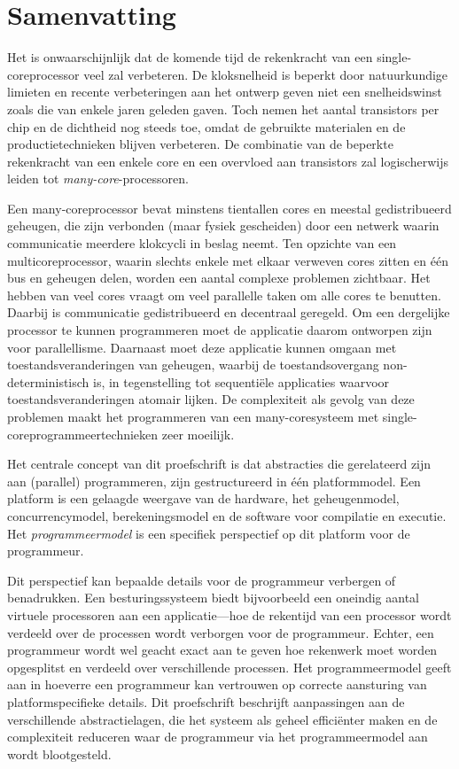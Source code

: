 \chapter*{Samenvatting}

Het is onwaarschijnlijk dat de komende tijd de rekenkracht van een single-core\-processor veel zal verbeteren.
De kloksnelheid is beperkt door natuurkundige limieten en recente verbeteringen aan het ontwerp geven niet een snelheidswinst zoals die van enkele jaren geleden gaven.
Toch nemen het aantal transistors per chip en de dichtheid nog steeds toe, omdat de gebruikte materialen en de productietechnieken blijven verbeteren.
De combinatie van de beperkte rekenkracht van een enkele core en een overvloed aan transistors zal logischerwijs leiden tot \emph{many-core}-processoren.

Een many-core\-processor bevat minstens tientallen cores en meestal gedistribueerd geheugen, die zijn verbonden (maar fysiek gescheiden) door een netwerk waarin communicatie meerdere klokcycli in beslag neemt.
Ten opzichte van een multicoreprocessor, waarin slechts enkele met elkaar verweven cores zitten en \'e\'en bus en geheugen delen, worden een aantal complexe problemen zichtbaar.
Het hebben van veel cores vraagt om veel parallelle taken om alle cores te benutten. Daarbij is communicatie gedistribueerd en decentraal geregeld.
Om een dergelijke processor te kunnen programmeren moet de applicatie daarom ontworpen zijn voor parallellisme.
Daarnaast moet deze applicatie kunnen omgaan met toestandsveranderingen van geheugen, waarbij de toestandsovergang non-deterministisch is, in tegenstelling tot sequenti\"ele applicaties waarvoor toestandsveranderingen atomair lijken.
De complexiteit als gevolg van deze problemen maakt het programmeren van een many-core\-systeem met single-core\-programmeertechnieken zeer moeilijk.

%
Het centrale concept van dit proefschrift is dat abstracties die gerelateerd zijn aan (parallel) programmeren, zijn gestructureerd in \'e\'en platformmodel.
Een platform is een gelaagde weergave van de hardware, het geheugenmodel, concurrencymodel, berekeningsmodel en de software voor compilatie en executie.
Het \emph{programmeermodel} is een specifiek perspectief op dit platform voor de programmeur.

Dit perspectief kan bepaalde details voor de programmeur verbergen of benadrukken.
Een besturingssysteem biedt bijvoorbeeld een oneindig aantal virtuele processoren aan een applicatie---hoe de rekentijd van een processor wordt verdeeld over de processen wordt verborgen voor de programmeur.
Echter, een programmeur wordt wel geacht exact aan te geven hoe rekenwerk moet worden opgesplitst en verdeeld over verschillende processen.
Het programmeermodel geeft aan in hoeverre een programmeur kan vertrouwen op correcte aansturing van platformspecifieke details.
Dit proefschrift beschrijft aanpassingen aan de verschillende abstractielagen, die het systeem als geheel effici\"enter maken en de complexiteit reduceren waar de programmeur via het programmeermodel aan wordt blootgesteld.

